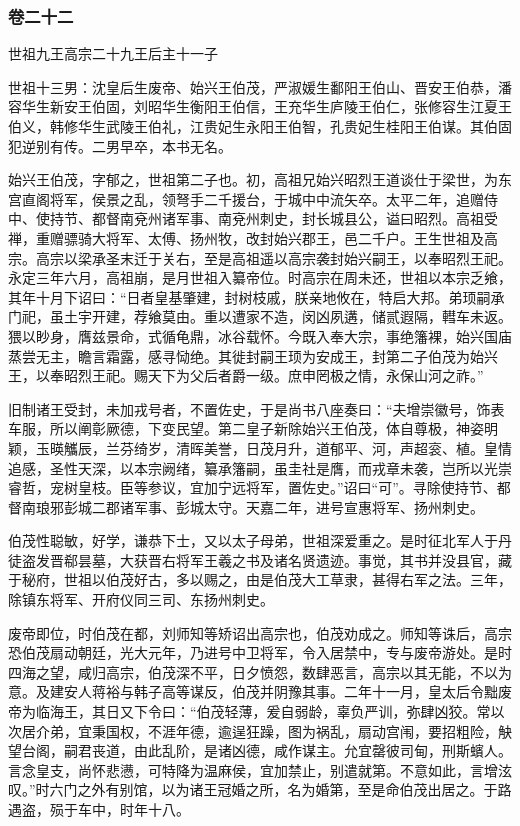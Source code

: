 \documentclass[]{article}
\begin{document}
\hypertarget{header-n4848}{%
\subsubsection{卷二十二}\label{header-n4848}}

世祖九王高宗二十九王后主十一子

世祖十三男：沈皇后生废帝、始兴王伯茂，严淑媛生鄱阳王伯山、晋安王伯恭，潘容华生新安王伯固，刘昭华生衡阳王伯信，王充华生庐陵王伯仁，张修容生江夏王伯义，韩修华生武陵王伯礼，江贵妃生永阳王伯智，孔贵妃生桂阳王伯谋。其伯固犯逆别有传。二男早卒，本书无名。

始兴王伯茂，字郁之，世祖第二子也。初，高祖兄始兴昭烈王道谈仕于梁世，为东宫直阁将军，侯景之乱，领弩手二千援台，于城中中流矢卒。太平二年，追赠侍中、使持节、都督南兗州诸军事、南兗州刺史，封长城县公，谥曰昭烈。高祖受禅，重赠骠骑大将军、太傅、扬州牧，改封始兴郡王，邑二千户。王生世祖及高宗。高宗以梁承圣末迁于关右，至是高祖遥以高宗袭封始兴嗣王，以奉昭烈王祀。永定三年六月，高祖崩，是月世祖入纂帝位。时高宗在周未还，世祖以本宗乏飨，其年十月下诏曰：``日者皇基肇建，封树枝戚，朕亲地攸在，特启大邦。弟顼嗣承门祀，虽土宇开建，荐飨莫由。重以遭家不造，闵凶夙遘，储贰遐隔，轊车未返。猥以眇身，膺兹景命，式循龟鼎，冰谷载怀。今既入奉大宗，事绝籓裸，始兴国庙蒸尝无主，瞻言霜露，感寻恸绝。其徙封嗣王顼为安成王，封第二子伯茂为始兴王，以奉昭烈王祀。赐天下为父后者爵一级。庶申罔极之情，永保山河之祚。''

旧制诸王受封，未加戎号者，不置佐史，于是尚书八座奏曰：``夫增崇徽号，饰表车服，所以阐彰厥德，下变民望。第二皇子新除始兴王伯茂，体自尊极，神姿明颖，玉暎觿辰，兰芬绮岁，清晖美誉，日茂月升，道郁平、河，声超衮、植。皇情追感，圣性天深，以本宗阙绪，纂承籓嗣，虽圭社是膺，而戎章未袭，岂所以光崇睿哲，宠树皇枝。臣等参议，宜加宁远将军，置佐史。''诏曰``可''。寻除使持节、都督南琅邪彭城二郡诸军事、彭城太守。天嘉二年，进号宣惠将军、扬州刺史。

伯茂性聪敏，好学，谦恭下士，又以太子母弟，世祖深爱重之。是时征北军人于丹徒盗发晋郗昙墓，大获晋右将军王羲之书及诸名贤遗迹。事觉，其书并没县官，藏于秘府，世祖以伯茂好古，多以赐之，由是伯茂大工草隶，甚得右军之法。三年，除镇东将军、开府仪同三司、东扬州刺史。

废帝即位，时伯茂在都，刘师知等矫诏出高宗也，伯茂劝成之。师知等诛后，高宗恐伯茂扇动朝廷，光大元年，乃进号中卫将军，令入居禁中，专与废帝游处。是时四海之望，咸归高宗，伯茂深不平，日夕愤怨，数肆恶言，高宗以其无能，不以为意。及建安人蒋裕与韩子高等谋反，伯茂并阴豫其事。二年十一月，皇太后令黜废帝为临海王，其日又下令曰：``伯茂轻薄，爰自弱龄，辜负严训，弥肆凶狡。常以次居介弟，宜秉国权，不涯年德，逾逞狂躁，图为祸乱，扇动宫闱，要招粗险，觖望台阁，嗣君丧道，由此乱阶，是诸凶德，咸作谋主。允宜罄彼司甸，刑斯蠙人。言念皇支，尚怀悲懑，可特降为温麻侯，宜加禁止，别遣就第。不意如此，言增泫叹。''时六门之外有别馆，以为诸王冠婚之所，名为婚第，至是命伯茂出居之。于路遇盗，殒于车中，时年十八。
\end{document}
